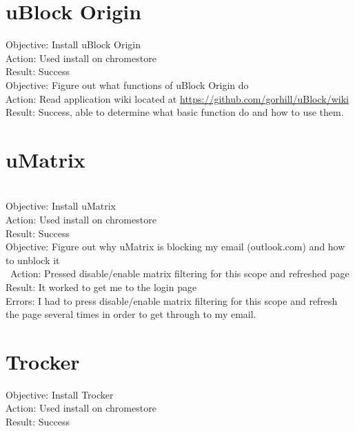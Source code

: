 \documentclass{article}
\begin{document}
\section{uBlock Origin}

Objective: Install uBlock Origin\\
Action: Used install on chromestore\\
Result: Success\\

Objective: Figure out what functions of uBlock Origin do\\
Action: Read application wiki located at \href{https://github.com/gorhill/uBlock/wiki}{https://github.com/gorhill/uBlock/wiki} 
Result: Success, able to determine what basic function do and how to use them.

\section{uMatrix}\\
Objective: Install uMatrix \\
Action: Used install on chromestore\\
Result: Success\\

Objective: Figure out why uMatrix is blocking my email (outlook.com) and how to unblock it\\\
Action: Pressed disable/enable matrix filtering for this scope and refreshed page\\
Result: It worked to get me to the login page\\
Errors: I had to press disable/enable matrix filtering for this scope and refresh the page several times in order to get through to my email. \\

\section{Trocker}
Objective: Install Trocker \\
Action: Used install on chromestore\\
Result: Success\\
\end{document}
